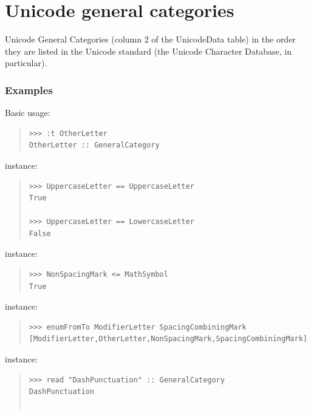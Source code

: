 \section{Unicode general categories}
\begin{haddockdesc}
\item[\begin{tabular}{@{}l}
data GeneralCategory
\end{tabular}]
{\haddockbegindoc
Unicode General Categories (column 2 of the UnicodeData table) in
 the order they are listed in the Unicode standard (the Unicode
 Character Database, in particular).\par
\subsubsection*{\textbf{Examples}}
Basic usage:\par
\begin{quote}
{\haddockverb\begin{verbatim}
>>> :t OtherLetter
OtherLetter :: GeneralCategory

\end{verbatim}}
\end{quote}
 instance:\par
\begin{quote}
{\haddockverb\begin{verbatim}
>>> UppercaseLetter == UppercaseLetter
True

>>> UppercaseLetter == LowercaseLetter
False

\end{verbatim}}
\end{quote}
 instance:\par
\begin{quote}
{\haddockverb\begin{verbatim}
>>> NonSpacingMark <= MathSymbol
True

\end{verbatim}}
\end{quote}
 instance:\par
\begin{quote}
{\haddockverb\begin{verbatim}
>>> enumFromTo ModifierLetter SpacingCombiningMark
[ModifierLetter,OtherLetter,NonSpacingMark,SpacingCombiningMark]

\end{verbatim}}
\end{quote}
 instance:\par
\begin{quote}
{\haddockverb\begin{verbatim}
>>> read "DashPunctuation" :: GeneralCategory
DashPunctuation


\end{verbatim}}
\end{quote}}
\end{haddockdesc}
